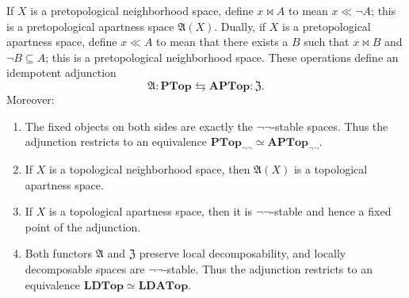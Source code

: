 \documentclass{article}
\def\cpl#1{\neg #1}
\def\anti{\mathfrak{A}}
\def\neigh{\mathfrak{Z}}
\def\nn{\ensuremath{\neg\neg}}
\def\PTop{\mathbf{PTop}}
\def\PTopnn{\mathbf{PTop}_{\nn}}
\def\LDTop{\mathbf{LDTop}}
\def\APTop{\mathbf{APTop}}
\def\APTopnn{\mathbf{APTop}_{\nn}}
\def\LDATop{\mathbf{LDATop}}
\begin{document}
\begin{thm}\label{thm:top-ll-bowtie}
  If $X$ is a pretopological neighborhood space, define $x\bowtie A$ to mean $x\ll \cpl{A}$; this is a pretopological apartness space $\anti(X)$.
  Dually, if $X$ is a pretopological apartness space, define $x\ll A$ to mean that there exists a $B$ such that $x\bowtie B$ and $\cpl{B}\subseteq A$; this is a pretopological neighborhood space.
  These operations define an idempotent adjunction
  \[ \anti : \PTop \leftrightarrows \APTop : \neigh. \]
  Moreover:
  \begin{enumerate}
  \item The fixed objects on both sides are exactly the \nn-stable spaces.
    Thus the adjunction restricts to an equivalence $\PTopnn \simeq \APTopnn$.
  \item If $X$ is a topological neighborhood space, then $\anti(X)$ is a topological apartness space.
  \item If $X$ is a topological apartness space, then it is \nn-stable and hence a fixed point of the adjunction.
  \item Both functors $\anti$ and $\neigh$ preserve local decomposability, and locally decomposable spaces are \nn-stable.
    Thus the adjunction restricts to an equivalence $\LDTop \simeq \LDATop$.
    \label{item:top-ll-bowtie-equiv}
  \end{enumerate}
\end{thm}
\end{document}
